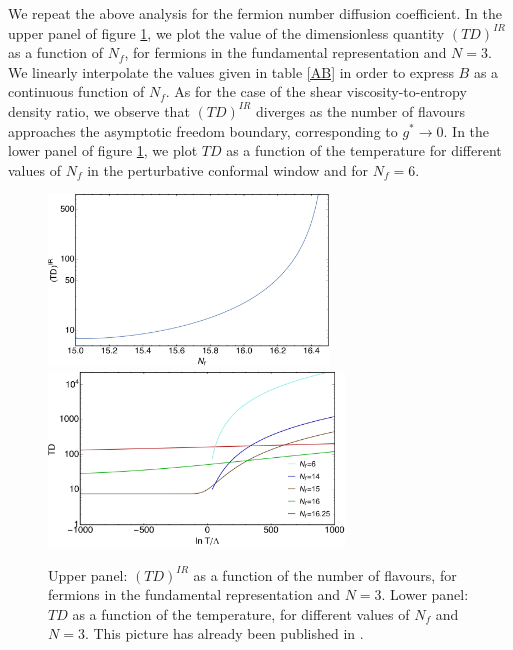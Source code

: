   
We repeat the above analysis for the fermion number diffusion coefficient. In the upper panel of figure \ref{D_Nf}, we plot the value of the dimensionless quantity $(T D)^{IR}$ as a function of $N_f$, for fermions in the fundamental representation and $N=3$. We linearly interpolate the values given in table \ref{AB} in order to express $B$ as a continuous function of $N_f$.
As for the case of the shear viscosity-to-entropy density ratio, we observe that $(TD)^{IR}$ diverges as the number of flavours approaches the asymptotic freedom boundary, corresponding to $g^* \to 0$. In the lower panel of figure \ref{D_Nf}, we plot $T D$ as a function of the temperature for different values of $N_f$ in the perturbative conformal window and for $N_f=6$. 

\begin{figure}[b!]
\begin{center}
\includegraphics[width=0.665\textwidth]{pics/TDaN3} \\
\includegraphics[width=0.7\textwidth]{pics/Temperature-TDaN3}
\end{center}
\caption{Upper panel: $(T D)^{IR}$ as a function of the number of flavours, for fermions in the fundamental representation and $N=3$. Lower panel: $T D$ as a function of the temperature, for different values of $N_f$ and $N=3$. This picture has already been published in \cite{Toniato:2016twr}.}
\label{D_Nf}
\end{figure}

